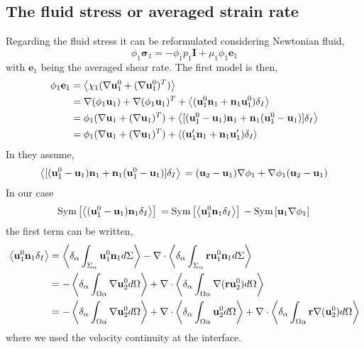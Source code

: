 \subsection{The fluid stress or averaged strain rate}
Regarding the fluid stress it can be reformulated considering Newtonian fluid,
\begin{equation}
    \phi_1 \bm{\sigma}_1 
    = - \phi_1 p_1 \textbf{I}
    + \mu_1 \phi_1 \textbf{e}_1
\end{equation}
with $\textbf{e}_1$ being the averaged shear rate. 
The first model is then, 
\begin{align*}
    \phi_1 \textbf{e}_1
    &= \left<\chi_1 (\nabla \textbf{u}_1^0+(\nabla \textbf{u}_1^0)^T)\right>\\
    &= \nabla (\phi_1\textbf{u}_1)+ \mathbf{\nabla} (\phi_1\textbf{u}_1)^T
    + \left<(\textbf{u}_1^0  \textbf{n}_1 +  \textbf{n}_1\textbf{u}_1^0)\delta_I\right>\\
    &= \phi_1 (\nabla \textbf{u}_1+ (\mathbf{\nabla} \textbf{u}_1)^T)
    + \left<[(\textbf{u}_1^0 - \textbf{u}_1)  \textbf{n}_1 +  \textbf{n}_1(\textbf{u}_1^0 - \textbf{u}_1 )]\delta_I\right>\\
    &= \phi_1 (\nabla \textbf{u}_1+ (\mathbf{\nabla} \textbf{u}_1)^T)
    + \left<(\textbf{u}_1' \textbf{n}_1 +  \textbf{n}_1\textbf{u}_1')\delta_I\right>\\
\end{align*}
In \citet[chap 9]{ishii2010thermo} they assume,
\begin{equation}
    \left<[(\textbf{u}_1^0 - \textbf{u}_1)  \textbf{n}_1 +  \textbf{n}_1(\textbf{u}_1^0 - \textbf{u}_1 )]\delta_I\right>\\
    = 
    (\textbf{u}_2 - \textbf{u}_1)  \mathbf{\nabla} \phi_1 +  \mathbf{\nabla} \phi_1(\textbf{u}_2 - \textbf{u}_1 )\\
\end{equation}
In our case 
\begin{equation}
    \text{Sym}\left[\left<(\textbf{u}_1^0 - \textbf{u}_1)  \textbf{n}_1\delta_I \right> \right]\\
    = 
    \text{Sym}\left[\left<\textbf{u}_1^0  \textbf{n}_1\delta_I  \right> \right]\\
    - \text{Sym}\left[\textbf{u}_1 \mathbf{\nabla} \phi_1 \right]\\
\end{equation}
the first term can be written, 
\begin{align}
    \left<\textbf{u}_1^0  \textbf{n}_1\delta_I  \right>
    &=
    \left<\delta_\alpha \int_{\Sigma_\alpha} \textbf{u}_1^0  \textbf{n}_1 d\Sigma  \right>
    -\mathbf{\nabla}\cdot \left<\delta_\alpha \int_{\Sigma_\alpha} \textbf{r}\textbf{u}_1^0  \textbf{n}_1 d\Sigma  \right>\\
    &=
    - \left<\delta_\alpha \int_{\Omega\alpha} \mathbf{\nabla} \textbf{u}_2^0   d\Omega   \right>
    + \mathbf{\nabla}\cdot \left<\delta_\alpha \int_{\Omega\alpha} \mathbf{\nabla} (\textbf{ru}_2^0 )  d\Omega   \right>\\
    &=
    - \left<\delta_\alpha \int_{\Omega\alpha} \mathbf{\nabla} \textbf{u}_2^0   d\Omega   \right>
    + \mathbf{\nabla}\cdot\left<\delta_\alpha \int_{\Omega\alpha} \textbf{u}_2^0   d\Omega   \right>
    + \mathbf{\nabla}\cdot\left<\delta_\alpha \int_{\Omega\alpha} \textbf{r} \mathbf{\nabla} (\textbf{u}_2^0 )  d\Omega   \right>
\end{align}
where we used the velocity continuity at the interface. 

